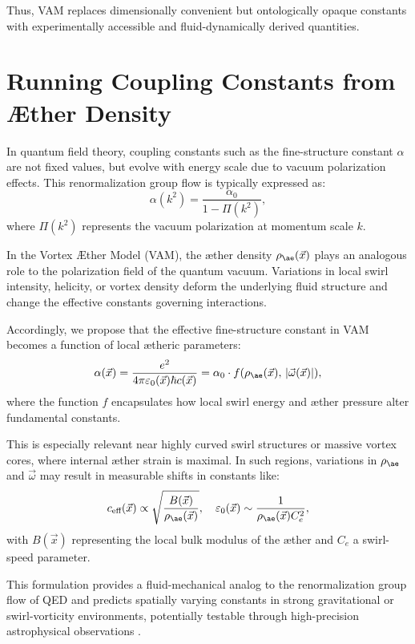 Thus, VAM replaces dimensionally convenient but ontologically opaque constants with experimentally accessible and fluid-dynamically derived quantities.

\section{Running Coupling Constants from Æther Density}

In quantum field theory, coupling constants such as the fine-structure constant $\alpha$ are not fixed values, but evolve with energy scale due to vacuum polarization effects. This renormalization group flow is typically expressed as:
\begin{equation}
\alpha(k^2) = \frac{\alpha_0}{1 - \Pi(k^2)},
\end{equation}
where $\Pi(k^2)$ represents the vacuum polarization at momentum scale $k$.

In the Vortex Æther Model (VAM), the æther density $\rho_{\ae}(\vec{x})$ plays an analogous role to the polarization field of the quantum vacuum. Variations in local swirl intensity, helicity, or vortex density deform the underlying fluid structure and change the effective constants governing interactions.

Accordingly, we propose that the effective fine-structure constant in VAM becomes a function of local ætheric parameters:
\begin{equation}
\alpha(\vec{x}) = \frac{e^2}{4\pi \varepsilon_0(\vec{x}) \hbar c(\vec{x})} = \alpha_0 \cdot f(\rho_{\ae}(\vec{x}), \, |\vec{\omega}(\vec{x})|),
\end{equation}
where the function $f$ encapsulates how local swirl energy and æther pressure alter fundamental constants.

This is especially relevant near highly curved swirl structures or massive vortex cores, where internal æther strain is maximal. In such regions, variations in $\rho_{\ae}$ and $\vec{\omega}$ may result in measurable shifts in constants like:
\begin{equation}
c_{\text{eff}}(\vec{x}) \propto \sqrt{\frac{B(\vec{x})}{\rho_{\ae}(\vec{x})}}, \quad \varepsilon_0(\vec{x}) \sim \frac{1}{\rho_{\ae}(\vec{x}) C_e^2},
\end{equation}
with $B(\vec{x})$ representing the local bulk modulus of the æther and $C_e$ a swirl-speed parameter.

This formulation provides a fluid-mechanical analog to the renormalization group flow of QED and predicts spatially varying constants in strong gravitational or swirl-vorticity environments, potentially testable through high-precision astrophysical observations \cite{verlinde2016emergent,shapiro2004variation,uzan2011varying}.


